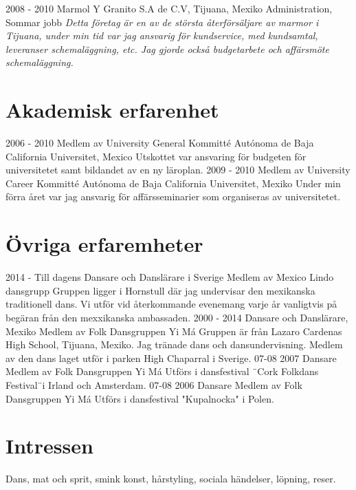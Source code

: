 \documentclass[]{friggeri-cv}
\begin{document}
\begin{entrylist}
  \entry
    {2008 - 2010}
    {Marmol Y Granito S.A de C.V, Tijuana, Mexiko}
    {Administration, Sommar jobb}
    {\emph{Detta företag är en av de största återförsäljare av marmor i Tijuana, under min tid var jag ansvarig för kundservice, med kundsamtal, leveranser schemaläggning, etc. Jag gjorde också budgetarbete och affärsmöte schemaläggning.}}
\end{entrylist}

\section{Akademisk erfarenhet}
\begin{entrylist}
  \entry
    {2006 - 2010}
    {Medlem av University General Kommitté}
    {Autónoma de Baja California Universitet, Mexico}
    {Utskottet var ansvaring för budgeten för universitetet samt bildandet av en ny läroplan.}
  \entry
    {2009 - 2010}
    {Medlem av University Career Kommitté}
    {Autónoma de Baja California Universitet, Mexiko}
    {Under min förra året var jag ansvarig för affärsseminarier som organiseras av universitetet.}
\end{entrylist}

\section{Övriga erfaremheter}

\begin{entrylist}
  \entry
    {2014 - Till dagens}
    {Dansare och Danslärare i Sverige}
    {Medlem av Mexico Lindo dansgrupp}
    {Gruppen ligger i Hornstull där jag undervisar den mexikanska traditionell dans. Vi utför vid återkommande evenemang varje år vanligtvis på begäran från den mexxikanska ambassaden.}
  \entry
    {2000 - 2014}
    {Dansare och Danslärare, Mexiko}
    {Medlem av Folk Dansgruppen Yi Má}
    {Gruppen är från Lazaro Cardenas High School, Tijuana, Mexiko. Jag tränade dans och dansundervisning.
    Medlem av den dans laget utför i parken High Chaparral i Sverige.}
  \entry
    {07-08 2007}
    {Dansare}
    {Medlem av Folk Dansgruppen Yi Má}
    {Utförs i dansfestival ¨Cork Folkdans Festival¨i Irland och Amsterdam.}
  \entry
    {07-08 2006}
    {Dansare}
    {Medlem av Folk Dansgruppen Yi Má}
    {Utförs i dansfestival "Kupalnocka" i Polen.}
\end{entrylist}

\section{Intressen}
    Dans, mat och sprit, smink konst, hårstyling, sociala händelser, löpning, reser.
\end{document}
